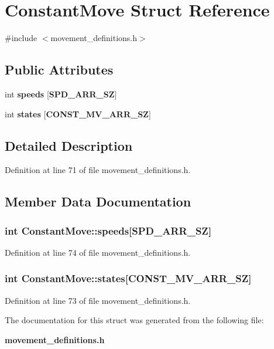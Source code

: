 \section{\-Constant\-Move \-Struct \-Reference}
\label{structConstantMove}


{\ttfamily \#include $<$movement\-\_\-definitions.\-h$>$}

\subsection*{\-Public \-Attributes}
\begin{DoxyCompactItemize}
\item 
int {\bf speeds} [{\bf \-S\-P\-D\-\_\-\-A\-R\-R\-\_\-\-S\-Z}]
\item 
int {\bf states} [{\bf \-C\-O\-N\-S\-T\-\_\-\-M\-V\-\_\-\-A\-R\-R\-\_\-\-S\-Z}]
\end{DoxyCompactItemize}


\subsection{\-Detailed \-Description}


\-Definition at line 71 of file movement\-\_\-definitions.\-h.



\subsection{\-Member \-Data \-Documentation}
\subsubsection[{speeds}]{\setlength{\rightskip}{0pt plus 5cm}int {\bf \-Constant\-Move\-::speeds}[{\bf \-S\-P\-D\-\_\-\-A\-R\-R\-\_\-\-S\-Z}]}\label{structConstantMove_a5c8f7515c66ed62480950f5937037f09}


\-Definition at line 74 of file movement\-\_\-definitions.\-h.

\subsubsection[{states}]{\setlength{\rightskip}{0pt plus 5cm}int {\bf \-Constant\-Move\-::states}[{\bf \-C\-O\-N\-S\-T\-\_\-\-M\-V\-\_\-\-A\-R\-R\-\_\-\-S\-Z}]}\label{structConstantMove_a4e63d2d1fa0a42d2a462cd9ad3a7b9f2}


\-Definition at line 73 of file movement\-\_\-definitions.\-h.



\-The documentation for this struct was generated from the following file\-:\begin{DoxyCompactItemize}
\item 
{\bf movement\-\_\-definitions.\-h}\end{DoxyCompactItemize}

